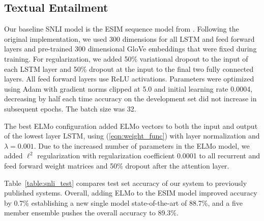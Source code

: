 \documentclass[11pt,a4paper]{article}
\newcommand{\ELMO}{ELMo}
\begin{document}
\subsection{Textual Entailment}
Our baseline SNLI model is the ESIM sequence model from \citet{Chen2017EnhancedLF}.
Following the original implementation, we used 300 dimensions for all LSTM and feed forward layers and pre-trained 300 dimensional GloVe embeddings that were fixed during training.
For regularization, we added 50\% variational dropout \citep{Gal2016ATG} to the input of each LSTM layer and 50\% dropout \citep{Srivastava2014DropoutAS} at the input to the final two fully connected layers.  All feed forward layers use ReLU activations.
Parameters were optimized using Adam \citep{Kingma2014AdamAM} with gradient norms clipped at 5.0 and initial learning rate 0.0004, decreasing by half each time accuracy on the development set did not increase in subsequent epochs.  The batch size was 32.

The best \ELMO{} configuration added \ELMO{} vectors to both the input and output of the lowest layer LSTM,
using (\ref{eqn:weight_func}) with layer normalization and $\lambda=0.001$.  Due to the increased number of parameters in the \ELMO{} model, we added $\ell^2$ regularization with regularization coefficient 0.0001 to
all recurrent and feed forward weight matrices and 50\% dropout after the attention layer.

Table~\ref{table:snli_test} compares test set accuracy of our system to previously published systems.
Overall, adding \ELMO{} to the ESIM model improved accuracy by 0.7\% establishing a new
single model state-of-the-art of 88.7\%, and a five member ensemble pushes the overall accuracy to 89.3\%.
\end{document}
